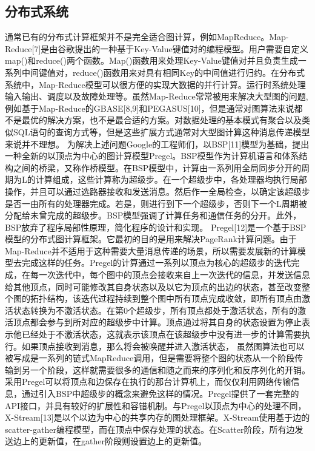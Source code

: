 \subsection{分布式系统}
通常已有的分布式计算框架并不是完全适合图计算，例如MapReduce。Map-Reduce[7]是由谷歌提出的一种基于Key-Value键值对的编程模型。用户需要自定义map()和reduce()两个函数。Map()函数用来处理Key-Value键值对并且负责生成一系列中间键值对，reduce()函数用来对具有相同Key的中间值进行归约。在分布式系统中，Map-Reduce模型可以很方便的实现大数据的并行计算。运行时系统处理输入输出、调度以及故障处理等。虽然Map-Reduce常常被用来解决大型图的问题,例如基于Map-Reduce的GBASE[8,9]和PEGASUS[10]，但是通常对图算法来说都不是最优的解决方案，也不是最合适的方案。对数据处理的基本模式有聚合以及类似SQL语句的查询方式等，但是这些扩展方式通常对大型图计算这种消息传递模型来说并不理想。
为解决上述问题Google的工程师们，以BSP[11]模型为基础，提出一种全新的以顶点为中心的图计算模型Pregel。BSP模型作为计算机语言和体系结构之间的桥梁，又称作桥模型。在BSP模型中，计算由一系列用全局同步分开的周期为L的计算组成，这些计算称为超级步。在一个超级步中，各处理器均执行局部操作，并且可以通过选路器接收和发送消息。然后作一全局检查，以确定该超级步是否一由所有的处理器完成。若是，则进行到下一个超级步，否则下一个L周期被分配给未曾完成的超级步。BSP模型强调了计算任务和通信任务的分开。此外，BSP放弃了程序局部性原理，简化程序的设计和实现。
Pregel[12]是一个基于BSP模型的分布式图计算框架。它最初的目的是用来解决PageRank计算问题。由于Map-Reduce并不适用于这种需要大量消息传递的场景，所以需要发展新的计算模型去完成这样的任务。Pregel的计算通过一系列以顶点为核心的超级步的迭代完成，在每一次迭代中，每个图中的顶点会接收来自上一次迭代的信息，并发送信息给其他顶点，同时可能修改其自身状态以及以它为顶点的出边的状态，甚至改变整个图的拓扑结构，该迭代过程持续到整个图中所有顶点完成收敛，即所有顶点由激活状态转换为不激活状态。在第0个超级步，所有顶点都处于激活状态，所有的激活顶点都会参与到所对应的超级步中计算。顶点通过将其自身的状态设置为停止表示他已经处于不激活状态，这就表示该顶点在该超级步中没有进一步的计算需要执行。如果顶点接收到消息，那么将会被唤醒并进入激活状态，
虽然图算法也可以被写成是一系列的链式MapReduce调用，但是需要将整个图的状态从一个阶段传输到另一个阶段，这样就需要很多的通信和随之而来的序列化和反序列化的开销。采用Pregel可以将顶点和边保存在执行的那台计算机上，而仅仅利用网络传输信息，通过引入BSP中超级步的概念来避免这样的情况。Pregel提供了一套完整的API接口，并具有较好的扩展性和容错机制。与Pregel以顶点为中心的处理不同，X-Stream[13]是以个以边为中心的共享内存的图处理框架。X-Stream使用基于边的scatter-gather编程模型，而在顶点中保存处理的状态。在Scatter阶段，所有边发送边上的更新值，在gather阶段则设置边上的更新值。
